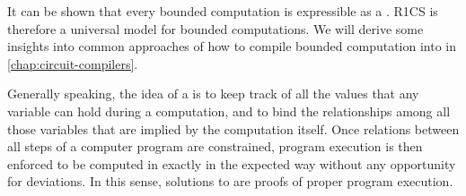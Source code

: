 It can be shown that every bounded computation is expressible as a . R1CS is therefore a universal model for bounded computations. We will derive some insights into common approaches of how to compile bounded computation into  in \chaptname{} \ref{chap:circuit-compilers}. 

Generally speaking, the idea of a  is to keep track of all the values that any variable can hold during a computation, and to bind the relationships among all those variables that are implied by the computation itself. Once relations between all steps of a computer program are constrained, program execution is then enforced to be computed in exactly in the expected way without any opportunity for deviations. In this sense, solutions to  are proofs of proper program execution.

